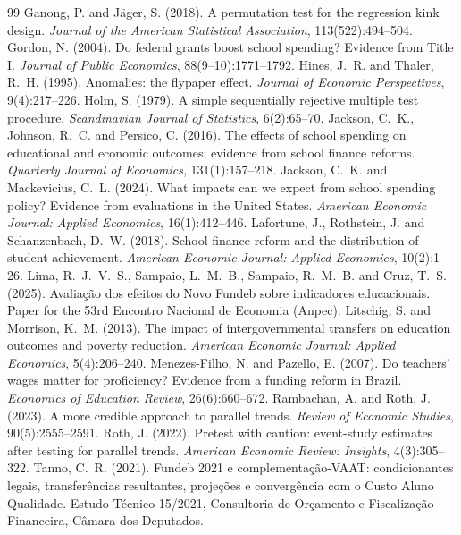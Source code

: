 \documentclass[11pt]{article}
\begin{document}
\begin{thebibliography}{99}
 Ganong, P. and J\"ager, S. (2018). A permutation test for the regression kink design. \textit{Journal of the American Statistical Association}, 113(522):494--504.
 Gordon, N. (2004). Do federal grants boost school spending? Evidence from Title I. \textit{Journal of Public Economics}, 88(9--10):1771--1792.
 Hines, J.~R. and Thaler, R.~H. (1995). Anomalies: the flypaper effect. \textit{Journal of Economic Perspectives}, 9(4):217--226.
 Holm, S. (1979). A simple sequentially rejective multiple test procedure. \textit{Scandinavian Journal of Statistics}, 6(2):65--70.
 Jackson, C.~K., Johnson, R.~C. and Persico, C. (2016). The effects of school spending on educational and economic outcomes: evidence from school finance reforms. \textit{Quarterly Journal of Economics}, 131(1):157--218.
 Jackson, C.~K. and Mackevicius, C.~L. (2024). What impacts can we expect from school spending policy? Evidence from evaluations in the United States. \textit{American Economic Journal: Applied Economics}, 16(1):412--446.
 Lafortune, J., Rothstein, J. and Schanzenbach, D.~W. (2018). School finance reform and the distribution of student achievement. \textit{American Economic Journal: Applied Economics}, 10(2):1--26.
 Lima, R.~J.~V.~S., Sampaio, L.~M.~B., Sampaio, R.~M.~B. and Cruz, T.~S. (2025). Avaliação dos efeitos do Novo Fundeb sobre indicadores educacionais. Paper for the 53rd Encontro Nacional de Economia (Anpec).
 Litschig, S. and Morrison, K.~M. (2013). The impact of intergovernmental transfers on education outcomes and poverty reduction. \textit{American Economic Journal: Applied Economics}, 5(4):206--240.
 Menezes-Filho, N. and Pazello, E. (2007). Do teachers' wages matter for proficiency? Evidence from a funding reform in Brazil. \textit{Economics of Education Review}, 26(6):660--672.
 Rambachan, A. and Roth, J. (2023). A more credible approach to parallel trends. \textit{Review of Economic Studies}, 90(5):2555--2591.
 Roth, J. (2022). Pretest with caution: event-study estimates after testing for parallel trends. \textit{American Economic Review: Insights}, 4(3):305--322.
 Tanno, C.~R. (2021). Fundeb 2021 e complementação-VAAT: condicionantes legais, transferências resultantes, projeções e convergência com o Custo Aluno Qualidade. Estudo Técnico 15/2021, Consultoria de Orçamento e Fiscalização Financeira, Câmara dos Deputados.
\end{thebibliography}
\end{document}
